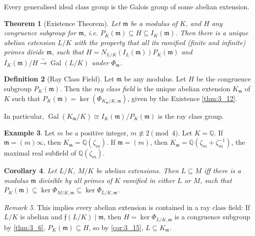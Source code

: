 \documentclass[11pt]{article}
\theoremstyle{definition}
\newtheorem{definition}{Definition}[section]
\newtheorem{example}[definition]{Example}
\theoremstyle{plain}
\newtheorem{theorem}[definition]{Theorem}
\newtheorem{corollary}[definition]{Corollary}
\theoremstyle{remark}
\newtheorem{remark}[definition]{Remark}
\DeclareMathOperator{\Gal}{Gal}
\newcommand{\QQ}{\mathbb{Q}}
\newcommand{\ff}{\mathfrak{f}}
\newcommand{\fm}{\mathfrak{m}}
\begin{document}
Every generalised ideal class group is the Galois group of some abelian extension.

\begin{theorem}[Existence Theorem]\label{thm:3_12}
    Let $\fm$ be a modulus of $K$, and $H$ any congruence subgroup for $\fm$, i.e. $P_K(\fm) \subseteq H \subseteq I_K(\fm)$. Then there is a unique abelian extension $L/K$ with the property that all its ramified (finite and infinite) primes divide $\fm$, such that $H = N_{L/K}(I_L(\fm)) P_K(\fm)$ and $I_K(\fm) / H \xrightarrow{\sim} \Gal(L/K)$ under $\Phi_\fm$.
\end{theorem}

\begin{definition}[Ray Class Field]\label{def:3_13}
    Let $\fm$ be any modulus. Let $H$ be the congruence subgroup $P_K(\fm)$. Then the \emph{ray class field} is the unique abelian extension $K_\fm$ of $K$ such that $P_K(\fm) = \ker(\Phi_{K_\fm / K, \fm})$, given by the Existence \autoref{thm:3_12}.

    In particular, $\Gal(K_\fm / K) \cong I_K(\fm)/P_K(\fm)$ is the ray class group.
\end{definition}

\begin{example}\label{eg:3_14}
    Let $m$ be a positive integer, $m \not\equiv 2 \pmod{4}$. Let $K = \QQ$. If $\fm = (m) \infty$, then $K_\fm = \QQ(\zeta_m)$. If $\fm = (m)$, then $K_\fm = \QQ(\zeta_m + \zeta_m^{-1})$, the maximal real subfield of $\QQ(\zeta_m)$.
\end{example}

\begin{corollary}\label{cor:3_15}
    Let $L/K$, $M/K$ be abelian extensions. Then $L \subseteq M$ iff there is a modulus $\fm$ divisible by all primes of $K$ ramified in either $L$ or $M$, such that $P_K(\fm) \subseteq \ker \Phi_{M/K, \fm} \subseteq \ker \Phi_{L/K, \fm}$.
\end{corollary}

\begin{remark}\label{rem:3_16}
    This implies every abelian extension is contained in a ray class field: If $L/K$ is abelian and $\ff(L/K) \mid \fm$, then $H = \ker \Phi_{L/K, \fm}$ is a congruence subgroup by \autoref{thm:3_6}, $P_K(\fm) \subseteq H$, so by \autoref{cor:3_15}, $L \subseteq K_\fm$.
\end{remark}
\end{document}
